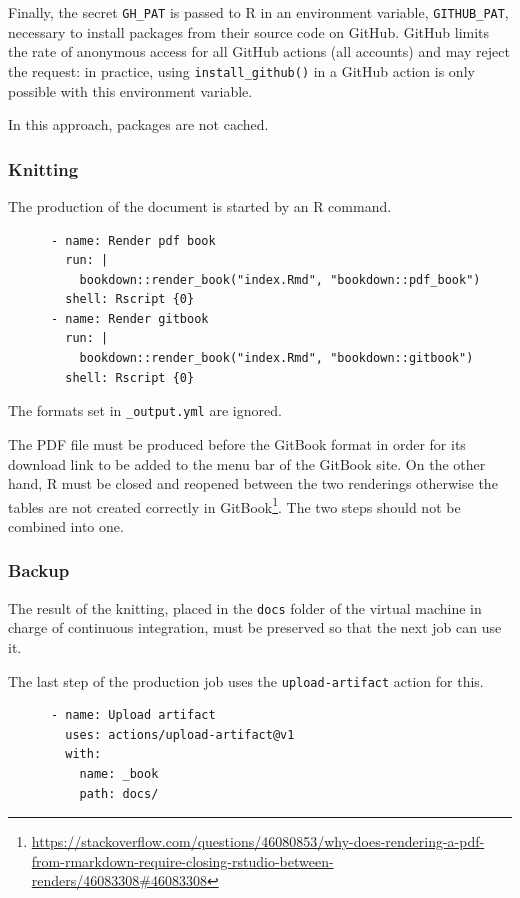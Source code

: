 \documentclass[
  12pt,
  american,
  a4paper,
  extrafontsizes,onecolumn,openright
  ]{memoir}
\newlength{\rf}
\begin{document}
Finally, the secret \texttt{GH\_PAT} is passed to R in an environment variable, \texttt{GITHUB\_PAT}, necessary to install packages from their source code on GitHub.
GitHub limits the rate of anonymous access for all GitHub actions (all accounts) and may reject the request: in practice, using \texttt{install\_github()} in a GitHub action is only possible with this environment variable.

In this approach, packages are not cached.

\hypertarget{knitting}{%
\subsubsection{Knitting}\label{knitting}}

The production of the document is started by an R command.

\begin{verbatim}
      - name: Render pdf book
        run: |
          bookdown::render_book("index.Rmd", "bookdown::pdf_book")
        shell: Rscript {0}
      - name: Render gitbook
        run: |
          bookdown::render_book("index.Rmd", "bookdown::gitbook")
        shell: Rscript {0}
\end{verbatim}

The formats set in \texttt{\_output.yml} are ignored.

The PDF file must be produced before the GitBook format in order for its download link to be added to the menu bar of the GitBook site.
On the other hand, R must be closed and reopened between the two renderings otherwise the tables are not created correctly in GitBook\footnote{\url{https://stackoverflow.com/questions/46080853/why-does-rendering-a-pdf-from-rmarkdown-require-closing-rstudio-between-renders/46083308\#46083308}}.
The two steps should not be combined into one.

\hypertarget{backup}{%
\subsubsection{Backup}\label{backup}}

The result of the knitting, placed in the \texttt{docs} folder of the virtual machine in charge of continuous integration, must be preserved so that the next job can use it.

The last step of the production job uses the \texttt{upload-artifact} action for this.

\begin{verbatim}
      - name: Upload artifact
        uses: actions/upload-artifact@v1
        with:
          name: _book
          path: docs/
\end{verbatim}
\end{document}

